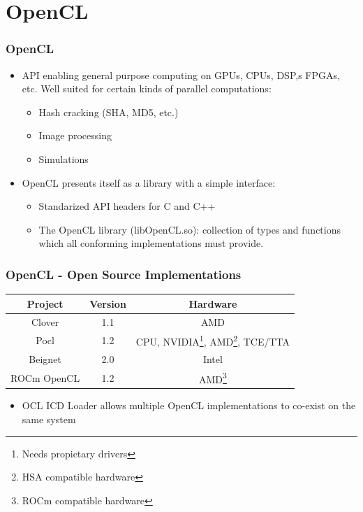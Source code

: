 \documentclass{smilebeamer}
\begin{document}
\section{OpenCL}
\begin{frame}
\frametitle{OpenCL}
\begin{itemize}
  \item API enabling general purpose computing on GPUs, CPUs, DSP,s FPGAs, etc.
  Well suited for certain kinds of parallel computations:
  \begin{itemize}
    \item Hash cracking (SHA, MD5, etc.)
    \item Image processing
    \item Simulations
  \end{itemize}
  \item OpenCL presents itself as a library with a simple interface:
  \begin{itemize}
    \item Standarized API headers for C and C++
    \item The OpenCL library (libOpenCL.so): collection of types and functions
    which all conforming implementations must provide.
  \end{itemize}
\end{itemize}
\end{frame}

\begin{frame}
\frametitle{OpenCL - Open Source Implementations}
\centering
{
\begin{tabular}{c|c|c}
\textbf{Project} & \textbf{Version} & \textbf{Hardware} \\
\hline
Clover & 1.1 & AMD\\
Pocl & 1.2 & CPU, NVIDIA\footnote{Needs propietary drivers}, AMD\footnote{HSA
compatible hardware}, TCE/TTA\\
Beignet & 2.0 & Intel\\
ROCm OpenCL & 1.2 & AMD\footnote{ROCm compatible hardware}\\
\end{tabular}
}
\vfill
\begin{itemize}
  \item OCL ICD Loader allows multiple OpenCL implementations to co-exist on
  the same system
\end{itemize}
\end{frame}
\end{document}
